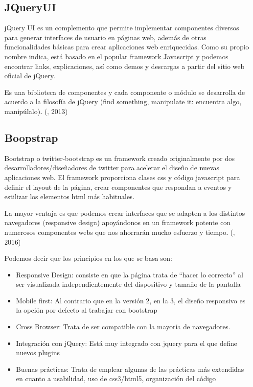 \subsection{JQueryUI}
\setlength{\parskip}{5mm}
jQuery UI es un complemento que permite implementar componentes diversos para generar interfaces de usuario en páginas web, además de otras funcionalidades básicas para crear aplicaciones web enriquecidas. Como su propio nombre indica, está basado en el popular framework Javascript y podemos encontrar links, explicaciones, así como demos y descargas a partir del sitio web oficial de jQuery.

Es una biblioteca de componentes y cada componente o módulo se desarrolla de acuerdo a la filosofía de jQuery (find something, manipulate it: encuentra algo, manipúlalo).
\setlength{\parskip}{0mm}
(\citet{jqueryuibib}, 2013)

\subsection{Boopstrap}
\setlength{\parskip}{5mm}
Bootstrap o twitter-bootstrap es un framework creado originalmente por dos desarrolladores/diseñadores de twitter para acelerar el diseño de nuevas aplicaciones web.
El framework proporciona clases css y código javascript para definir el layout de la página, crear componentes que respondan a eventos y estilizar los elementos html más habituales.

La mayor ventaja es que podemos crear interfaces que se adapten a los distintos navegadores (responsive design) apoyándonos en un framework potente con numerosos componentes webs que nos ahorrarán mucho esfuerzo y tiempo. (\citet{bootstrap}, 2016)

Podemos decir que los principios en los que se basa son:
\setlength{\parskip}{0mm}
\begin{itemize}

	\item Responsive Design: consiste en que la página trata de “hacer lo correcto” al ser visualizada independientemente del dispositivo y tamaño de la pantalla
	
	\item Mobile first: Al contrario que en la versión 2, en la 3, el diseño responsivo es la opción por defecto al trabajar con bootstrap

	\item Cross Browser: Trata de ser compatible con la mayoría de navegadores.
	
	\item Integración con jQuery: Está muy integrado con jquery para el que define nuevos plugins

	\item Buenas prácticas: Trata de emplear algunas de las prácticas más extendidas en cuanto a usabilidad, uso de css3/html5, organización del código
	
	
\end{itemize}

